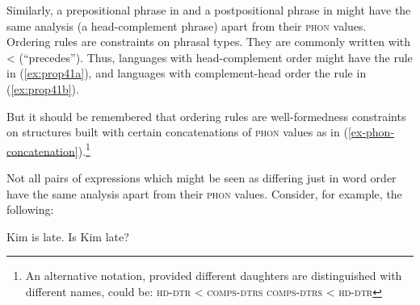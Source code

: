 \documentclass[output=paper,biblatex,babelshorthands,newtxmath,draftmode,colorlinks,citecolor=brown]{langscibook}
\begin{document}
\largerpage
\noindent
Similarly, a prepositional phrase in  and a postpositional phrase in  might have the same analysis (a head-complement phrase) apart from their \textsc{phon} values. Ordering rules are constraints on phrasal types. They are commonly written with < (``precedes''). Thus, languages with head-complement order might have the rule in (\ref{ex:prop41a}), and languages with complement-head order the rule in (\ref{ex:prop41b}).

\eal\label{ex:prop41}
\ex\label{ex:prop41a}
\ex\label{ex:prop41b}
\zl
%
But it should be remembered that ordering rules are well-formedness constraints on structures built with certain concatenations of \textsc{phon} values as in (\ref{ex-phon-concatenation}).\footnote{%
   An alternative notation, provided different daughters are distinguished with different names, could be:
   \eal
   \ex \textsc{hd-dtr} < \textsc{comps-dtrs}
   \ex \textsc{comps-dtrs} < \textsc{hd-dtr}
   \zl
}

Not all pairs of expressions which might be seen as differing just in word order have the same
analysis apart from their \textsc{phon} values.\label{page-properties:aux-inversion} Consider, for example, the following:

\eal\label{ex:prop42}
\ex\label{ex:prop42a}
Kim is late.
\ex\label{ex:prop42b}
Is Kim late?
\zl
\end{document}
